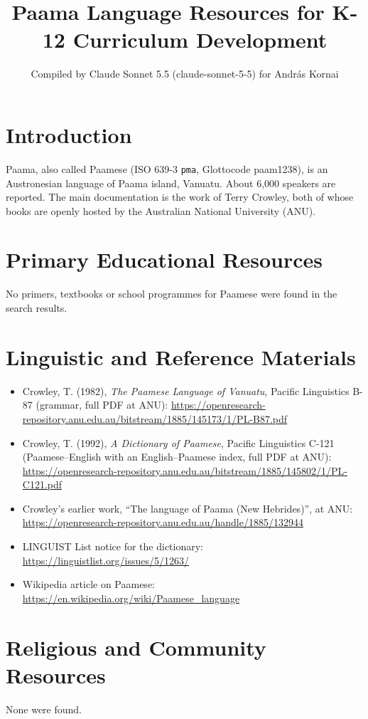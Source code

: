 \documentclass[12pt]{article}
\title{Paama Language Resources for K-12 Curriculum Development}
\author{Compiled by Claude Sonnet 5.5 (claude-sonnet-5-5) for Andr\'as Kornai}
\date{}
\begin{document}
\maketitle

\section{Introduction}
Paama, also called Paamese (ISO 639-3 \texttt{pma}, Glottocode paam1238), is an Austronesian language of Paama island, Vanuatu. About 6,000 speakers are reported. The main documentation is the work of Terry Crowley, both of whose books are openly hosted by the Australian National University (ANU).

\section{Primary Educational Resources}
No primers, textbooks or school programmes for Paamese were found in the search results.

\section{Linguistic and Reference Materials}
\begin{itemize}
\item Crowley, T. (1982), \emph{The Paamese Language of Vanuatu}, Pacific Linguistics B-87 (grammar, full PDF at ANU): \url{https://openresearch-repository.anu.edu.au/bitstream/1885/145173/1/PL-B87.pdf}
\item Crowley, T. (1992), \emph{A Dictionary of Paamese}, Pacific Linguistics C-121 (Paamese--English with an English--Paamese index, full PDF at ANU): \url{https://openresearch-repository.anu.edu.au/bitstream/1885/145802/1/PL-C121.pdf}
\item Crowley's earlier work, ``The language of Paama (New Hebrides)'', at ANU: \url{https://openresearch-repository.anu.edu.au/handle/1885/132944}
\item LINGUIST List notice for the dictionary: \url{https://linguistlist.org/issues/5/1263/}
\item Wikipedia article on Paamese: \url{https://en.wikipedia.org/wiki/Paamese_language}
\end{itemize}

\section{Religious and Community Resources}
None were found.
\end{document}
